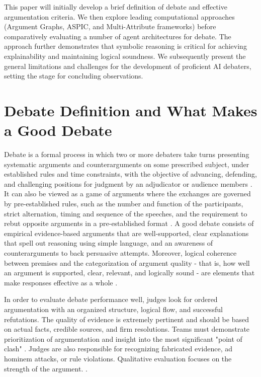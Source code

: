 \documentclass[conference]{IEEEtran}
\begin{document}
This paper will initially develop a brief definition of debate and effective argumentation criteria. We then explore leading computational approaches (Argument Graphs, ASPIC, and Multi-Attribute frameworks) before comparatively evaluating a number of agent architectures for debate. The approach further demonstrates that symbolic reasoning is critical for achieving explainability and maintaining logical soundness. We subsequently present the general limitations and challenges for the development of proficient AI debaters, setting the stage for concluding observations.

\section{Debate Definition and What Makes a Good Debate}
Debate is a formal process in which two or more debaters take turns presenting systematic arguments and counterarguments on some prescribed subject, under established rules and time constraints, with the objective of advancing, defending, and challenging positions for judgment by an adjudicator or audience members \cite{rakshit2019debbie}\cite{tan2016winning}. It can also be viewed as a game of arguments where the exchanges are governed by pre-established rules, such as the number and function of the participants, strict alternation, timing and sequence of the speeches, and the requirement to rebut opposite arguments in a pre-established format \cite{engelmann2022argumentation}. A good debate consists of empirical evidence-based arguments that are well-supported, clear explanations that spell out reasoning using simple language, and an awareness of counterarguments to back persuasive attempts. Moreover, logical coherence between premises and the categorization of argument quality - that is, how well an argument is supported, clear, relevant, and logically sound - are elements that make responses effective as a whole \cite{engelmann2022argumentation}.

In order to evaluate debate performance well, judges look for ordered argumentation with an organized structure, logical flow, and successful refutations. The quality of evidence is extremely pertinent and should be based on actual facts, credible sources, and firm resolutions. Teams must demonstrate prioritization of argumentation and insight into the most significant "point of clash" \cite{shuster2025judging}. Judges are also responsible for recognizing fabricated evidence, ad hominem attacks, or rule violations. Qualitative evaluation focuses on the strength of the argument. \cite{debatingforeveryone2025judge}\cite{shuster2025judging}.
\end{document}
